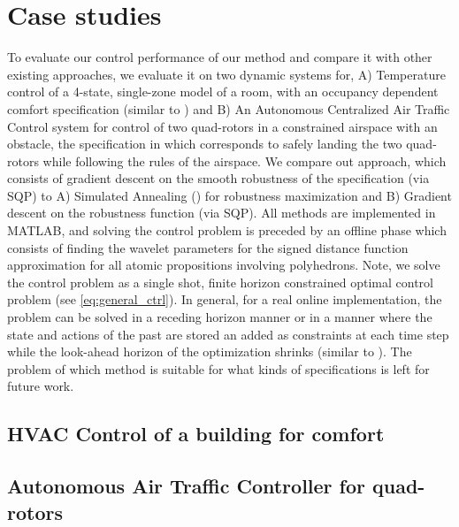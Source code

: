 \section{Case studies}
\label{sec:case study}

To evaluate our control performance of our method and compare it with other existing approaches, we evaluate it on two dynamic systems for, A) Temperature control of a 4-state, single-zone model of a room, with an occupancy dependent comfort specification (similar to \cite{Raman14_MPCSTL}) and B) An Autonomous Centralized Air Traffic Control system for control of two quad-rotors in a constrained airspace with an obstacle, the specification in which corresponds to safely landing the two quad-rotors while following the rules of the airspace. We compare out approach, which consists of gradient descent on the smooth robustness of the specification (via SQP) to A) Simulated Annealing (\cite{}) for robustness maximization and B) Gradient descent on the robustness function (via SQP). 
All methods are implemented in MATLAB, and solving the control problem is preceded by an offline phase which consists of finding the wavelet parameters for the signed distance function approximation for all atomic propositions involving polyhedrons. Note, we solve the control problem as a single shot, finite horizon constrained optimal control problem (see \eqref{eq:general_ctrl}). In general, for a real online implementation, the problem can be solved in a receding horizon manner or in a manner where the state and actions of the past are stored an added as constraints at each time step while the look-ahead horizon of the optimization shrinks (similar to \cite{Raman14_MPCSTL}). The problem of which method is suitable for what kinds of specifications is left for future work.



\subsection{HVAC Control of a building for comfort}



\subsection{Autonomous Air Traffic Controller for quad-rotors}


